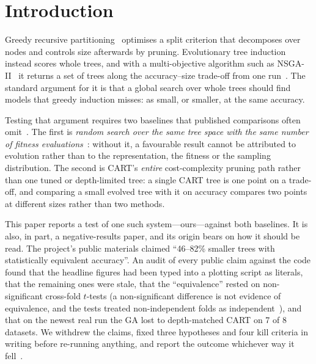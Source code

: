 \documentclass[sigconf,review,anonymous]{acmart}
\newcommand{\GA}{GA\xspace}
\begin{document}
\section{Introduction}

Greedy recursive partitioning~\cite{breiman1984} optimises a split criterion that
decomposes over nodes and controls size afterwards by pruning. Evolutionary tree
induction~\cite{barros2012,kretowski2019,rivera2022} instead scores whole trees, and with a
multi-objective algorithm such as NSGA-II~\cite{deb2002} it returns a set of trees along
the accuracy--size trade-off from one run~\cite{zhao2007}. The standard argument for it
is that a global search over whole trees should find models that greedy induction
misses: as small, or smaller, at the same accuracy.

Testing that argument requires two baselines that published comparisons often
omit~\cite{freitas2004,barros2012}. The first is \emph{random search over the same tree
space with the same number of fitness evaluations}~\cite{bergstra2012}: without it, a
favourable result cannot be attributed to evolution rather than to the representation,
the fitness or the sampling distribution. The second is CART's \emph{entire}
cost-complexity pruning path rather than one tuned or depth-limited tree: a single CART
tree is one point on a trade-off, and comparing a small evolved tree with it on accuracy
compares two points at different sizes rather than two methods.

This paper reports a test of one such system---ours---against both baselines. It is
also, in part, a negative-results paper, and its origin bears on how it should be read. The
project's public
materials claimed ``46--82\% smaller trees with statistically equivalent accuracy''. An
audit of every public claim against the code found that the headline figures had been
typed into a plotting script as literals, that the remaining ones were stale, that the
``equivalence'' rested on non-significant cross-fold $t$-tests (a non-significant
difference is not evidence of equivalence, and the tests treated non-independent folds as
independent~\cite{dietterich1998}), and that on the newest real
run the \GA lost to depth-matched CART on 7 of 8 datasets. We withdrew the claims,
fixed three hypotheses and four kill criteria in writing before re-running anything,
and report the outcome whichever way it fell~\cite{nosek2018}.
\end{document}
